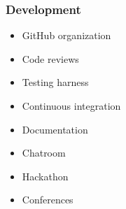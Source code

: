 \begin{frame}\frametitle{Development}

	\begin{multicols}{2}
	\vspace{0.3cm}
	\begin{itemize}\setlength\itemsep{1em}
	\item GitHub organization
	\item Code reviews
	\item Testing harness
	\item Continuous integration
	\end{itemize}

\columnbreak
	\pause

  \vspace{0.3cm}
	\begin{itemize}\setlength\itemsep{1em}
	\item Documentation
	\item Chatroom
	\item Hackathon
	\item Conferences
	\end{itemize}
	\end{multicols}

\end{frame}
